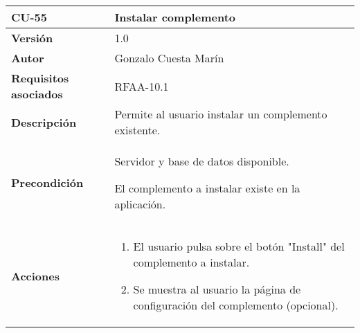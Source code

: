 \begin{longtable}[]{@{}ll@{}}
\toprule
\begin{minipage}[b]{0.24\columnwidth}\raggedright
\textbf{CU-55}\strut
\end{minipage} & \begin{minipage}[b]{0.71\columnwidth}\raggedright
\textbf{Instalar complemento}\strut
\end{minipage}\tabularnewline
\midrule
\endhead
\begin{minipage}[t]{0.24\columnwidth}\raggedright
\textbf{Versión}\strut
\end{minipage} & \begin{minipage}[t]{0.71\columnwidth}\raggedright
1.0\strut
\end{minipage}\tabularnewline
\begin{minipage}[t]{0.24\columnwidth}\raggedright
\textbf{Autor}\strut
\end{minipage} & \begin{minipage}[t]{0.71\columnwidth}\raggedright
Gonzalo Cuesta Marín\strut
\end{minipage}\tabularnewline
\begin{minipage}[t]{0.24\columnwidth}\raggedright
\textbf{Requisitos asociados}\strut
\end{minipage} & \begin{minipage}[t]{0.71\columnwidth}\raggedright
RFAA-10.1\strut
\end{minipage}\tabularnewline
\begin{minipage}[t]{0.24\columnwidth}\raggedright
\textbf{Descripción}\strut
\end{minipage} & \begin{minipage}[t]{0.71\columnwidth}\raggedright
Permite al usuario instalar un complemento existente.\strut
\end{minipage}\tabularnewline
\begin{minipage}[t]{0.24\columnwidth}\raggedright
\textbf{Precondición}\strut
\end{minipage} & \begin{minipage}[t]{0.71\columnwidth}\raggedright
Servidor y base de datos disponible.

El complemento a instalar existe en la aplicación.\strut
\end{minipage}\tabularnewline
\begin{minipage}[t]{0.24\columnwidth}\raggedright
\textbf{Acciones}\strut
\end{minipage} & \begin{minipage}[t]{0.71\columnwidth}\raggedright
\begin{enumerate}
\def\labelenumi{\arabic{enumi}.}
\tightlist
\item
  El usuario pulsa sobre el botón "Install" del complemento a instalar.
\item
  Se muestra al usuario la página de configuración del complemento
  (opcional).
\end{enumerate}


\end{minipage}
\end{longtable}

